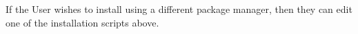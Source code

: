 \documentclass[UserManual.tex]{subfiles}
\begin{document}
\begin{sloppypar}
If the User wishes to install using a different package manager, then they can edit one of the installation scripts above.

\end{sloppypar}
\end{document}
